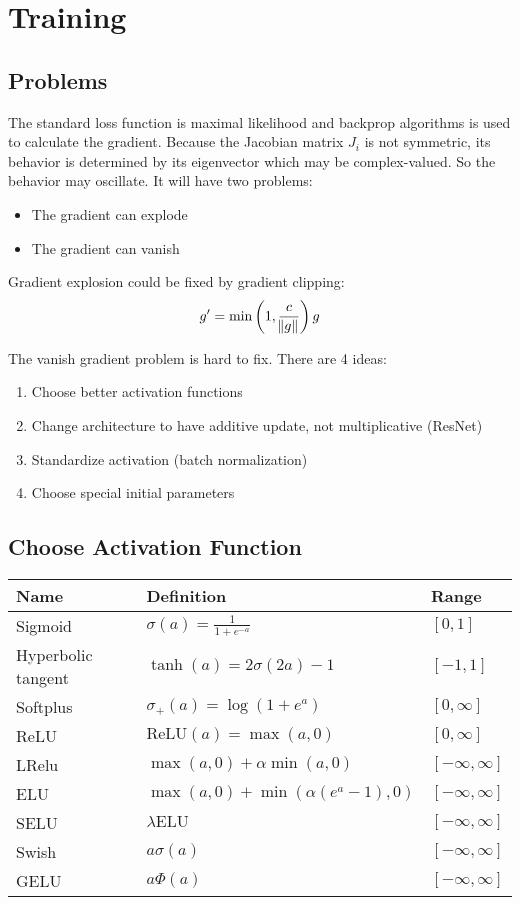 \chapter{Training}

\section{Problems}
The standard loss function is maximal likelihood and backprop algorithms is used to calculate the gradient. Because the Jacobian matrix $J_i$ is not symmetric, its behavior is determined by its eigenvector which may be complex-valued. So the behavior may oscillate. It will have two problems:
\begin{itemize}
    \item The gradient can explode
    \item The gradient can vanish
\end{itemize}

Gradient explosion could be fixed by gradient clipping:
\begin{equation}
    g' = \min \left(1, \frac{c}{\norm{g}}\right)g
\end{equation}

The vanish gradient problem is hard to fix. There are 4 ideas:
\begin{enumerate}
    \item Choose better activation functions
    \item Change architecture to have additive update, not multiplicative (ResNet)
    \item Standardize activation (batch normalization)
    \item Choose special initial parameters
\end{enumerate}


\section{Choose Activation Function}


\begin{table}[H]
\centering
\begin{tabular}[t]{lll}
Name & Definition & Range \\ \hline
Sigmoid & $\sigma(a) = \frac{1}{1 + e^{-a}}$ & $[0,1]$ \\
Hyperbolic tangent & $\tanh(a) = 2\sigma(2a) -1$ & $[-1,1]$ \\
Softplus & $\sigma_{+}(a) = \log(1 + e^a)$ & $[0,\infty]$ \\
ReLU & $\text{ReLU}(a) = \max(a,0)$ & $[0,\infty]$ \\
LRelu & $\max(a,0)+\alpha \min(a,0)$ & $[-\infty , \infty]$ \\
ELU & $\max(a,0) + \min(\alpha(e^a - 1), 0)$ & $[-\infty, \infty]$ \\
SELU & $\lambda \text{ELU}$ & $[-\infty, \infty]$ \\
Swish & $a\sigma(a)$ & $[-\infty,\infty]$ \\
GELU & $a \Phi(a)$ & $[-\infty,\infty]$\\
\end{tabular}
\end{table}

